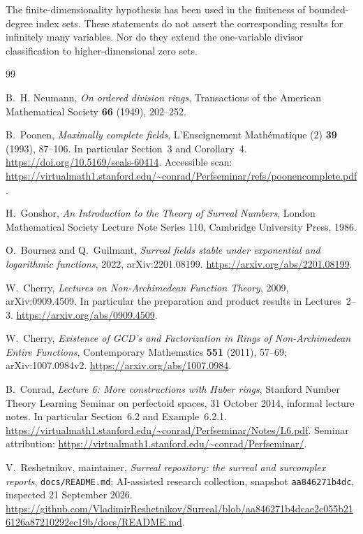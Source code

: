 \documentclass[11pt,letterpaper]{article}
\numberwithin{equation}{section}
\theoremstyle{definition}
\theoremstyle{remark}
\newcommand{\code}[1]{\texttt{#1}}
\begin{document}
The finite-dimensionality hypothesis has been used in the finiteness of
bounded-degree index sets. These statements do not assert the corresponding
results for infinitely many variables. Nor do they extend the
one-variable divisor classification to higher-dimensional zero sets.

\clearpage
{}
{}
\begingroup
\small\raggedright
\begin{thebibliography}{99}

B.~H. Neumann,
\emph{On ordered division rings},
Transactions of the American Mathematical Society \textbf{66} (1949),
202--252.

B.~Poonen,
\emph{Maximally complete fields},
L'Enseignement Math\'ematique (2) \textbf{39} (1993), 87--106.
In particular Section~3 and Corollary~4.
\url{https://doi.org/10.5169/seals-60414}.
Accessible scan:
\url{https://virtualmath1.stanford.edu/~conrad/Perfseminar/refs/poonencomplete.pdf}.

H.~Gonshor,
\emph{An Introduction to the Theory of Surreal Numbers},
London Mathematical Society Lecture Note Series 110,
Cambridge University Press, 1986.

O.~Bournez and Q.~Guilmant,
\emph{Surreal fields stable under exponential and logarithmic functions},
2022, arXiv:2201.08199.
\url{https://arxiv.org/abs/2201.08199}.

W.~Cherry,
\emph{Lectures on Non-Archimedean Function Theory},
2009, arXiv:0909.4509.
In particular the preparation and product results in Lectures~2--3.
\url{https://arxiv.org/abs/0909.4509}.

W.~Cherry,
\emph{Existence of GCD's and Factorization in Rings of Non-Archimedean
Entire Functions},
Contemporary Mathematics \textbf{551} (2011), 57--69;
arXiv:1007.0984v2.
\url{https://arxiv.org/abs/1007.0984}.

B.~Conrad,
\emph{Lecture 6: More constructions with Huber rings},
Stanford Number Theory Learning Seminar on perfectoid spaces,
31 October 2014, informal lecture notes.
In particular Section~6.2 and Example~6.2.1.
\url{https://virtualmath1.stanford.edu/~conrad/Perfseminar/Notes/L6.pdf}.
Seminar attribution:
\url{https://virtualmath1.stanford.edu/~conrad/Perfseminar/}.

V.~Reshetnikov, maintainer,
\emph{Surreal repository: the surreal and surcomplex reports},
\code{docs/README.md}; AI-assisted research collection,
snapshot \code{aa846271b4dc}, inspected 21 September 2026.
\url{https://github.com/VladimirReshetnikov/Surreal/blob/aa846271b4dcae2c055b216126a87210292ec19b/docs/README.md}.


\end{thebibliography}
\end{document}
